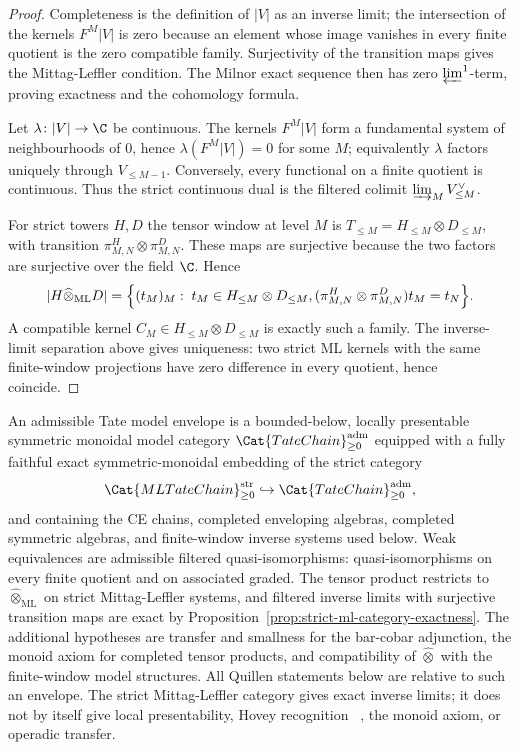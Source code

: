\begin{proof}
  Completeness is the definition of \(|V|\) as an inverse limit; the
  intersection of the kernels \(F^M|V|\) is zero because an element whose
  image vanishes in every finite quotient is the zero compatible family.
  Surjectivity of the transition maps gives the Mittag-Leffler condition.
  The Milnor exact sequence then has zero \(\varprojlim^1\)-term, proving
  exactness and the cohomology formula.

  Let \(\lambda\colon |V|\to\C\) be continuous.  The kernels
  \(F^M|V|\) form a fundamental system of neighbourhoods of \(0\), hence
  \(\lambda(F^M|V|)=0\) for some \(M\); equivalently \(\lambda\) factors
  uniquely through \(V_{\leq M-1}\).  Conversely, every functional on a
  finite quotient is continuous.  Thus the strict continuous dual is the
  filtered colimit \(\varinjlim_MV_{\leq M}^\vee\).

  For strict towers \(H,D\) the tensor window at level \(M\) is
  \(T_{\leq M}=H_{\leq M}\otimes D_{\leq M}\), with transition
  \(\pi^H_{M,N}\otimes\pi^D_{M,N}\).  These maps are surjective because
  the two factors are surjective over the field \(\C\).  Hence
  \[
    |H\widehat\otimes_{\mathrm{ML}}D|
      =
    \Bigl\{(t_M)_M:\;
      t_M\in H_{\leq M}\otimes D_{\leq M},
      (\pi^H_{M,N}\otimes\pi^D_{M,N})t_M=t_N
      \Bigr\}.
  \]
  A compatible kernel \(C_M\in H_{\leq M}\otimes D_{\leq M}\) is exactly
  such a family.  The inverse-limit separation above gives uniqueness:
  two strict ML kernels with the same finite-window projections have zero
  difference in every quotient, hence coincide.
\end{proof}

\begin{stmt}\label{stmt:tate-model-envelope}
  An admissible Tate model envelope is a bounded-below, locally
  presentable symmetric monoidal model category
  \(\Cat{TateChain}_{\geq0}^{\mathrm{adm}}\) equipped with a fully
  faithful exact symmetric-monoidal embedding of the strict category
  \[
    \Cat{MLTateChain}_{\geq0}^{\mathrm{str}}
      \hookrightarrow
    \Cat{TateChain}_{\geq0}^{\mathrm{adm}},
  \]
  and containing the CE chains, completed enveloping algebras, completed
  symmetric algebras, and finite-window inverse systems used below.
  Weak equivalences are admissible filtered
  quasi-isomorphisms: quasi-isomorphisms on every finite quotient and on
  associated graded.  The tensor product restricts to
  \(\widehat\otimes_{\mathrm{ML}}\) on strict Mittag-Leffler systems, and
  filtered inverse limits with surjective transition maps are exact by
  Proposition~\ref{prop:strict-ml-category-exactness}.  The additional
  hypotheses are transfer and smallness for the bar-cobar adjunction, the
  monoid axiom for completed tensor products, and compatibility of
  \(\widehat\otimes\) with the finite-window model structures.  All
  Quillen statements below are relative to such an envelope.  The strict
  Mittag-Leffler category gives exact inverse limits; it does not by
  itself give local presentability, Hovey recognition
  ~\cite{hovey}, the monoid axiom, or operadic transfer.
\end{stmt}

